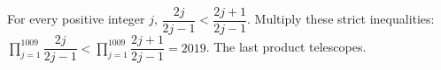 For every positive integer $j$, $\dfrac{2j}{2j-1}<\dfrac{2j+1}{2j-1}$. Multiply these strict inequalities: $\prod_{j=1}^{1009}\dfrac{2j}{2j-1}<\prod_{j=1}^{1009}\dfrac{2j+1}{2j-1}=2019$. The last product telescopes.
